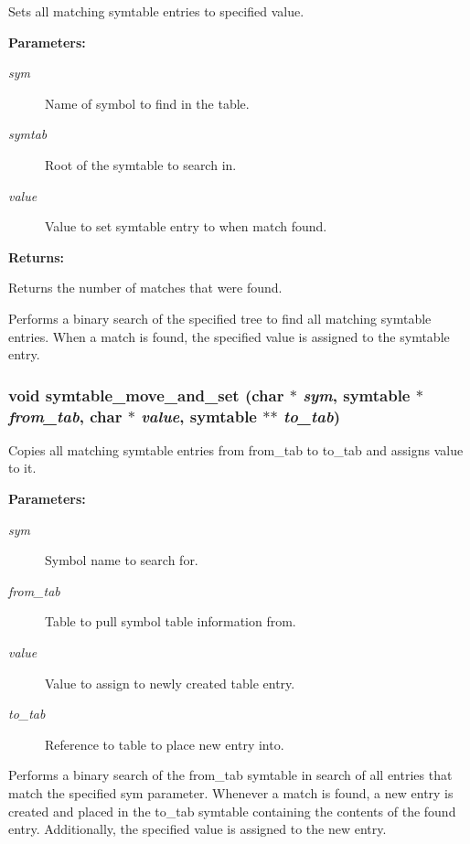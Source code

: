 Sets all matching symtable entries to specified value.

\begin{Desc}
\item[{\bf Parameters: }]\par
\begin{description}
\item[
{\em sym}]Name of symbol to find in the table. \item[
{\em symtab}]Root of the symtable to search in. \item[
{\em value}]Value to set symtable entry to when match found.

\end{description}
\end{Desc}
\begin{Desc}
\item[{\bf Returns: }]\par
Returns the number of matches that were found.

\end{Desc}
Performs a binary search of the specified tree to find all matching symtable entries. When a match is found, the specified value is assigned to the symtable entry. 
\subsubsection{\setlength{\rightskip}{0pt plus 5cm}void symtable\_\-move\_\-and\_\-set (char $\ast$ {\em sym}, {\bf symtable} $\ast$ {\em from\_\-tab}, char $\ast$ {\em value}, {\bf symtable} $\ast$$\ast$ {\em to\_\-tab})}\label{symtable_8h_a2}


Copies all matching symtable entries from from\_\-tab to to\_\-tab and assigns value to it.

\begin{Desc}
\item[{\bf Parameters: }]\par
\begin{description}
\item[
{\em sym}]Symbol name to search for. \item[
{\em from\_\-tab}]Table to pull symbol table information from. \item[
{\em value}]Value to assign to newly created table entry. \item[
{\em to\_\-tab}]Reference to table to place new entry into.

\end{description}
\end{Desc}
Performs a binary search of the from\_\-tab symtable in search of all entries that match the specified sym parameter. Whenever a match is found, a new entry is created and placed in the to\_\-tab symtable containing the contents of the found entry. Additionally, the specified value is assigned to the new entry. 